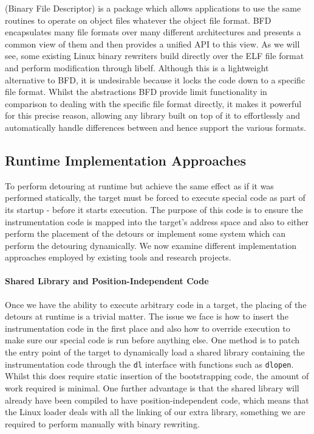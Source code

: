 (Binary File Descriptor) is a package which allows applications to use the same routines to operate on object files whatever the object file format\cite{bfd}. BFD encapsulates many file formats over many different architectures and presents a common view of them and then provides a unified API to this view. As we will see, some existing Linux binary rewriters build directly over the ELF file format and perform modification through libelf. Although this is a lightweight alternative to BFD, it is undesirable because it locks the code down to a specific file format. Whilst the abstractions BFD provide limit functionality in comparison to dealing with the specific file format directly, it makes it powerful for this precise reason, allowing any library built on top of it to effortlessly and automatically handle differences between and hence support the various formats.

\subsection{Runtime Implementation Approaches}

To perform detouring at runtime but achieve the same effect as if it was performed statically, the target must be forced to execute special code as part of its startup - before it starts execution. The purpose of this code is to ensure the instrumentation code is mapped into the target's address space and also to either perform the placement of the detours or implement some system which can perform the detouring dynamically. We now examine different implementation approaches employed by existing tools and research projects.

\paragraph{Shared Library and Position-Independent Code}

Once we have the ability to execute arbitrary code in a target, the placing of the detours at runtime is a trivial matter. The issue we face is how to insert the instrumentation code in the first place and also how to override execution to make sure our special code is run before anything else. One method is to patch the entry point of the target to dynamically load a shared library containing the instrumentation code through the \texttt{dl} interface with functions such as \texttt{dlopen}.  Whilst this does require static insertion of the bootstrapping code, the amount of work required is minimal. One further advantage is that the shared library will already have been compiled to have position-independent code, which means that the Linux loader deals with all the linking of our extra library, something we are required to perform manually with binary rewriting.

